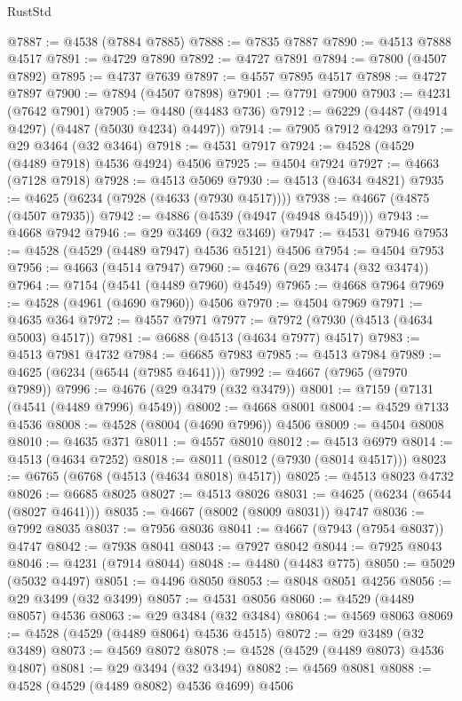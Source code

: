 \begin{lexlean}{RustStd}
\begin{coremodule}
@7887 := @4538 (@7884 @7885)
@7888 := @7835 @7887
@7890 := @4513 @7888 @4517
@7891 := @4729 @7890
@7892 := @4727 @7891
@7894 := @7800 (@4507 @7892)
@7895 := @4737 @7639
@7897 := @4557 @7895 @4517
@7898 := @4727 @7897
@7900 := @7894 (@4507 @7898)
@7901 := @7791 @7900
@7903 := @4231 (@7642 @7901)
@7905 := @4480 (@4483 @736)
@7912 := @6229 (@4487 (@4914 @4297) (@4487 (@5030 @4234) @4497))
@7914 := @7905 @7912 @4293
@7917 := @29 @3464 (@32 @3464)
@7918 := @4531 @7917
@7924 := @4528 (@4529 (@4489 @7918) @4536 @4924) @4506
@7925 := @4504 @7924
@7927 := @4663 (@7128 @7918)
@7928 := @4513 @5069
@7930 := @4513 (@4634 @4821)
@7935 := @4625 (@6234 (@7928 (@4633 (@7930 @4517))))
@7938 := @4667 (@4875 (@4507 @7935))
@7942 := @4886 (@4539 (@4947 (@4948 @4549)))
@7943 := @4668 @7942
@7946 := @29 @3469 (@32 @3469)
@7947 := @4531 @7946
@7953 := @4528 (@4529 (@4489 @7947) @4536 @5121) @4506
@7954 := @4504 @7953
@7956 := @4663 (@4514 @7947)
@7960 := @4676 (@29 @3474 (@32 @3474))
@7964 := @7154 (@4541 (@4489 @7960) @4549)
@7965 := @4668 @7964
@7969 := @4528 (@4961 (@4690 @7960)) @4506
@7970 := @4504 @7969
@7971 := @4635 @364
@7972 := @4557 @7971
@7977 := @7972 (@7930 (@4513 (@4634 @5003) @4517))
@7981 := @6688 (@4513 (@4634 @7977) @4517)
@7983 := @4513 @7981 @4732
@7984 := @6685 @7983
@7985 := @4513 @7984
@7989 := @4625 (@6234 (@6544 (@7985 @4641)))
@7992 := @4667 (@7965 (@7970 @7989))
@7996 := @4676 (@29 @3479 (@32 @3479))
@8001 := @7159 (@7131 (@4541 (@4489 @7996) @4549))
@8002 := @4668 @8001
@8004 := @4529 @7133 @4536
@8008 := @4528 (@8004 (@4690 @7996)) @4506
@8009 := @4504 @8008
@8010 := @4635 @371
@8011 := @4557 @8010
@8012 := @4513 @6979
@8014 := @4513 (@4634 @7252)
@8018 := @8011 (@8012 (@7930 (@8014 @4517)))
@8023 := @6765 (@6768 (@4513 (@4634 @8018) @4517))
@8025 := @4513 @8023 @4732
@8026 := @6685 @8025
@8027 := @4513 @8026
@8031 := @4625 (@6234 (@6544 (@8027 @4641)))
@8035 := @4667 (@8002 (@8009 @8031)) @4747
@8036 := @7992 @8035
@8037 := @7956 @8036
@8041 := @4667 (@7943 (@7954 @8037)) @4747
@8042 := @7938 @8041
@8043 := @7927 @8042
@8044 := @7925 @8043
@8046 := @4231 (@7914 @8044)
@8048 := @4480 (@4483 @775)
@8050 := @5029 (@5032 @4497)
@8051 := @4496 @8050
@8053 := @8048 @8051 @4256
@8056 := @29 @3499 (@32 @3499)
@8057 := @4531 @8056
@8060 := @4529 (@4489 @8057) @4536
@8063 := @29 @3484 (@32 @3484)
@8064 := @4569 @8063
@8069 := @4528 (@4529 (@4489 @8064) @4536 @4515)
@8072 := @29 @3489 (@32 @3489)
@8073 := @4569 @8072
@8078 := @4528 (@4529 (@4489 @8073) @4536 @4807)
@8081 := @29 @3494 (@32 @3494)
@8082 := @4569 @8081
@8088 := @4528 (@4529 (@4489 @8082) @4536 @4699) @4506

\end{coremodule}
\end{lexlean}
